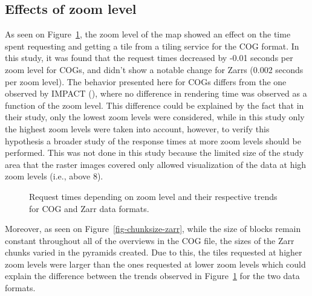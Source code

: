 \documentclass[
  oneside,
  open=any]{scrbook}
\begin{document}
\subsection{Effects of zoom level}\label{effects-of-zoom-level}

As seen on Figure~\ref{fig-comp-zoom}, the zoom level of the map showed
an effect on the time spent requesting and getting a tile from a tiling
service for the COG format. In this study, it was found that the request
times decreased by -0.01 seconds per zoom level for COGs, and didn't
show a notable change for Zarrs (0.002 seconds per zoom level). The
behavior presented here for COGs differs from the one observed by IMPACT
(), where no difference in
rendering time was observed as a function of the zoom level. This
difference could be explained by the fact that in their study, only the
lowest zoom levels were considered, while in this study only the highest
zoom levels were taken into account, however, to verify this hypothesis
a broader study of the response times at more zoom levels should be
performed. This was not done in this study because the limited size of
the study area that the raster images covered only allowed visualization
of the data at high zoom levels (i.e., above 8).

\begin{figure}[H]


\caption{\label{fig-comp-zoom}Request times depending on zoom level and
their respective trends for COG and Zarr data formats.}

\end{figure}%

Moreover, as seen on Figure~\ref{fig-chunksize-zarr}, while the size of
blocks remain constant throughout all of the overviews in the COG file,
the sizes of the Zarr chunks varied in the pyramids created. Due to
this, the tiles requested at higher zoom levels were larger than the
ones requested at lower zoom levels which could explain the difference
between the trends observed in Figure~\ref{fig-comp-zoom} for the two
data formats.
\end{document}
